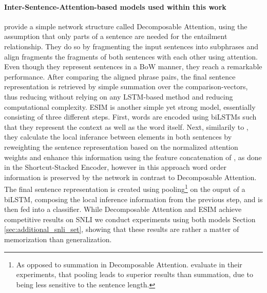 \paragraph*{Inter-Sentence-Attention-based models used within this work}
\cite{parikh2016decomposable} provide a simple network structure called Decomposable Attention, using the assumption that only parts of a sentence are needed for the entailment relationship. They do so by fragmenting the input sentences into subphrases and align fragments the fragments of both sentences with each other using attention. Even though they represent sentences in a \ac{BoW} manner, they reach a remarkable performance. After comparing the aligned phrase pairs, the final sentence representation is retrieved by simple summation over the comparison-vectors, thus reducing without relying on any \ac{LSTM}-based method and reducing computational complexity. \ac{ESIM} \citep{chen2017enhanced} is another simple yet strong model, essentially consisting of three different steps. First, words are encoded using \ac{biLSTM}s such that they represent the context as well as the word itself. Next, similarily to \cite{parikh2016decomposable}, they calculate the local inferance between elements in both sentences by reweighting the sentence representation based on the normalized attention weights and enhance this information using the feature concatenation of \cite{mou2015natural}, as done in the Shortcut-Stacked Encoder, however in this approach word order information is preserved by the network in contrast to Decomposable Attention. The final sentence representation is created using pooling\footnote{As opposed to summation in Decomposable Attention. \cite{chen2017enhanced} evaluate in their experiments, that pooling leads to superior results than summation, due to being less sensitive to the sentence length.} on the ouput of a \ac{biLSTM}, composing the local inference information from the previous step, and is then fed into a classifier. While Decomposable Attention and ESIM achieve competitive results on \ac{SNLI} we conduct experiments using both models Section \ref{sec:additional_snli_set}, showing that these results are rather a matter of memorization than generalization.

